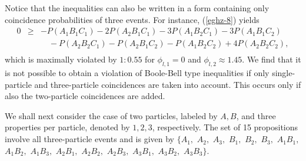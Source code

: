Notice that the inequalities can also be written in a form containing only
coincidence probabilities of three events.
For instance, (\ref{eghz-8}) yields
\begin{eqnarray}
0 &\ge&
 - P(A_1B_1C_1) - 2P(A_2B_1C_1) - 3P(A_1B_2C_1) - 3P(A_1B_1C_2)
\nonumber\\&&\quad
- P(A_2B_2C_1) - P(A_2B_1C_2) - P(A_1B_2C_2) + 4P(A_2B_2C_2),
\nonumber\\&&\quad
\label{eghz-7a}
\end{eqnarray}
which is maximally violated by $1:0.55$ for $\phi_{l,1}=0$ and
$\phi_{l,2}  \approx 1.45$.
We find that it is not possible to obtain  a violation of Boole-Bell type inequalities
if only  single-particle and three-particle coincidences are taken into account.
This occurs only if also the two-particle coincidences are added.



We shall next consider the case of two particles, labeled by
$A,B$,
and three properties per particle, denoted by $1,2,3$, respectively.
The set of 15 propositions involve all three-particle events and is given by
$\{
 A_1        ,$ $
 A_2        ,$ $
 A_3        ,$ $
 B_1        ,$ $
 B_2        ,$ $
 B_3        ,$ $
 A_1B_1     ,$ $
 A_1B_2     ,$ $
 A_1B_3     ,$ $
 A_2B_1     ,$ $
 A_2B_2     ,$ $
 A_2B_3     ,$ $
 A_3B_1     ,$ $
 A_3B_2     ,$ $
 A_3B_3
\}$.

